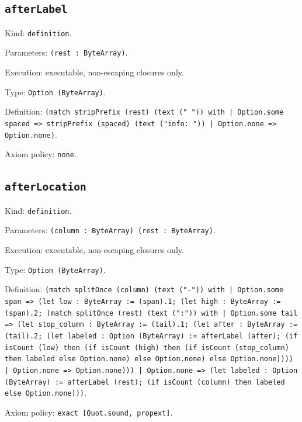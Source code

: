 \documentclass[11pt]{article}
\begin{document}
\subsection*{\texttt{afterLabel}}
\noindent Kind: \texttt{definition}.\par
\noindent Parameters: \texttt{(rest : ByteArray)}.\par
\noindent Execution: executable, non-escaping closures only.\par
\noindent Type: \texttt{Option (ByteArray)}.\par
\noindent Definition: \texttt{(match stripPrefix (rest) (text (" ")) with | Option.some spaced => stripPrefix (spaced) (text ("info: ")) | Option.none => Option.none)}.\par
\noindent Axiom policy: \texttt{none}.\par
\subsection*{\texttt{afterLocation}}
\noindent Kind: \texttt{definition}.\par
\noindent Parameters: \texttt{(column : ByteArray) (rest : ByteArray)}.\par
\noindent Execution: executable, non-escaping closures only.\par
\noindent Type: \texttt{Option (ByteArray)}.\par
\noindent Definition: \texttt{(match splitOnce (column) (text ("-")) with | Option.some span => (let low : ByteArray := (span).1; (let high : ByteArray := (span).2; (match splitOnce (rest) (text (":")) with | Option.some tail => (let stop\_column : ByteArray := (tail).1; (let after : ByteArray := (tail).2; (let labeled : Option (ByteArray) := afterLabel (after); (if isCount (low) then (if isCount (high) then (if isCount (stop\_column) then labeled else Option.none) else Option.none) else Option.none)))) | Option.none => Option.none))) | Option.none => (let labeled : Option (ByteArray) := afterLabel (rest); (if isCount (column) then labeled else Option.none)))}.\par
\noindent Axiom policy: \texttt{exact [Quot.sound, propext]}.\par
\end{document}
